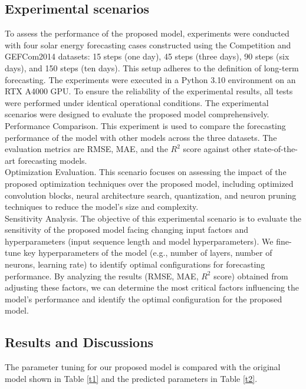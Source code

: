 \documentclass[sn-mathphys-num]{sn-jnl}%
\begin{document}
\subsection{Experimental scenarios}
To assess the performance of the proposed model, experiments were conducted with four solar energy forecasting cases constructed using the Competition and GEFCom2014 datasets: 15 steps (one day), 45 steps (three days), 90 steps (six days), and 150 steps (ten days). This setup adheres to the definition of long-term forecasting. The experiments were executed in a Python 3.10 environment on an RTX A4000 GPU. To ensure the reliability of the experimental results, all tests were performed under identical operational conditions. The experimental scenarios were designed to evaluate the proposed model comprehensively.\\
Performance Comparison. This experiment is used to compare the forecasting performance of the model with other models across the three datasets. The evaluation metrics are RMSE, MAE, and the $R^2$ score against other state-of-the-art forecasting models.\\
Optimization Evaluation. This scenario focuses on assessing the impact of the proposed optimization techniques over the proposed model, including optimized convolution blocks, neural architecture search, quantization, and neuron pruning techniques to reduce the model's size and complexity.\\
 Sensitivity Analysis. The objective of this experimental scenario is to evaluate the sensitivity of the proposed model facing changing input factors and hyperparameters (input sequence length and model hyperparameters). We fine-tune key hyperparameters of the model (e.g., number of layers, number of neurons, learning rate) to identify optimal configurations for forecasting performance. By analyzing the results (RMSE, MAE, $R^2$ score) obtained from adjusting these factors, we can determine the most critical factors influencing the model's performance and identify the optimal configuration for the proposed model.

\subsection{Results and Discussions}
The parameter tuning for our proposed model is compared with the original model shown in Table \ref{t1} and the predicted parameters in Table \ref{t2}.
\end{document}
